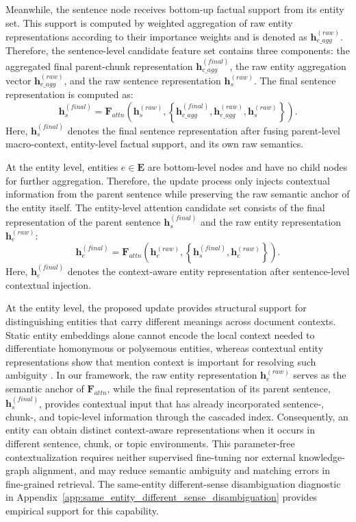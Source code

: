 \documentclass[a4paper,fleqn]{cas-dc}
\begin{document}
Meanwhile, the sentence node receives bottom-up factual support from its entity set. This support is computed by weighted aggregation of raw entity representations according to their importance weights and is denoted as $\mathbf{h}_{e\_agg}^{(raw)}$. Therefore, the sentence-level candidate feature set contains three components: the aggregated final parent-chunk representation $\mathbf{h}_{c\_agg}^{(final)}$, the raw entity aggregation vector $\mathbf{h}_{e\_agg}^{(raw)}$, and the raw sentence representation $\mathbf{h}_{s}^{(raw)}$. The final sentence representation is computed as:
\begin{equation}
\mathbf{h}_{s}^{(final)}
=
\mathbf{F}_{attn}
\left(
\mathbf{h}_{s}^{(raw)},
\left\{
\mathbf{h}_{c\_agg}^{(final)},
\mathbf{h}_{e\_agg}^{(raw)},
\mathbf{h}_{s}^{(raw)}
\right\}
\right).
\end{equation}
Here, $\mathbf{h}_{s}^{(final)}$ denotes the final sentence representation after fusing parent-level macro-context, entity-level factual support, and its own raw semantics.

At the entity level, entities $e \in \mathbf{E}$ are bottom-level nodes and have no child nodes for further aggregation. Therefore, the update process only injects contextual information from the parent sentence while preserving the raw semantic anchor of the entity itself. The entity-level attention candidate set consists of the final representation of the parent sentence $\mathbf{h}_{s}^{(final)}$ and the raw entity representation $\mathbf{h}_{e}^{(raw)}$:
\begin{equation}
\mathbf{h}_{e}^{(final)}
=
\mathbf{F}_{attn}
\left(
\mathbf{h}_{e}^{(raw)},
\left\{
\mathbf{h}_{s}^{(final)},
\mathbf{h}_{e}^{(raw)}
\right\}
\right).
\end{equation}
Here, $\mathbf{h}_{e}^{(final)}$ denotes the context-aware entity representation after sentence-level contextual injection.

At the entity level, the proposed update provides structural support for distinguishing entities that carry different meanings across document contexts. Static entity embeddings alone cannot encode the local context needed to differentiate homonymous or polysemous entities, whereas contextual entity representations show that mention context is important for resolving such ambiguity \citep{Yamada2020LUKE}. In our framework, the raw entity representation $\mathbf{h}_{e}^{(raw)}$ serves as the semantic anchor of $\mathbf{F}_{attn}$, while the final representation of its parent sentence, $\mathbf{h}_{s}^{(final)}$, provides contextual input that has already incorporated sentence-, chunk-, and topic-level information through the cascaded index. Consequently, an entity can obtain distinct context-aware representations when it occurs in different sentence, chunk, or topic environments. This parameter-free contextualization requires neither supervised fine-tuning nor external knowledge-graph alignment, and may reduce semantic ambiguity and matching errors in fine-grained retrieval. The same-entity different-sense disambiguation diagnostic in Appendix~\ref{app:same_entity_different_sense_disambiguation} provides empirical support for this capability.
\end{document}
